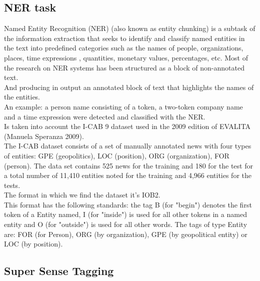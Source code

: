 \documentclass[twocolumn,10pt]{wmrDoc}
\begin{document}
\subsection{NER task}
Named Entity Recognition (NER) (also known as entity chunking) is a subtask of the information extraction that seeks to identify and classify named entities in the text into predefined categories such as the names of people, organizations, places, time expressions , quantities, monetary values, percentages, etc.
Most of the research on NER systems has been structured as a block of non-annotated text.\\
And producing in output an annotated block of text that highlights the names of the entities.\\
An example: a person name consisting of a token, a two-token company name and a time expression were detected and classified with the NER.\\
Is taken into account the I-CAB 9 dataset used in the 2009 edition of EVALITA (Manuela Speranza 2009).\\
The I-CAB dataset consists of a set of manually annotated news with four types of entities: GPE (geopolitics), LOC (position), ORG (organization), FOR (person). 
The data set contains 525 news for the training and 180 for the test for a total number of 11,410 entities noted for the training and 4,966 entities for the tests.\\
The format in which we find the dataset it's IOB2.\\
This format has the following standards: the tag B (for "begin") denotes the first token of a Entity named, I (for "inside") is used for all other tokens in a named entity and O (for "outside") is used for all other words. The tags of type Entity are: FOR (for Person), ORG (by organization), GPE (by geopolitical entity) or LOC (by position).\\




\subsection{Super Sense Tagging}
\end{document}
